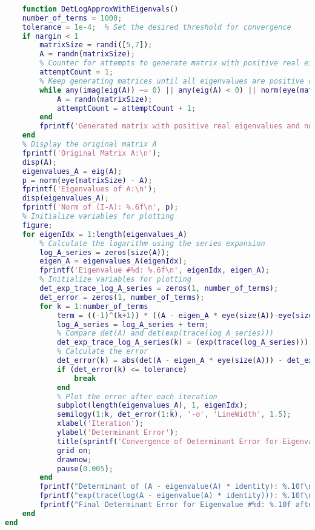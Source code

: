 \begin{sourcecode}
\label{sourcecode-eigenvalues}  
    \begin{lstlisting}[language=MATLAB]
    
    function DetLogApproxWithEigenvals()
    number_of_terms = 1000;
    tolerance = 1e-4;  % Set the desired threshold for convergence
    if nargin < 1
        matrixSize = randi([5,7]);
        A = randn(matrixSize);
        % Counter for attempts to generate matrix with positive real eigenvalues
        attemptCount = 1;
        % Keep generating matrices until all eigenvalues are positive real numbers
        while any(imag(eig(A)) ~= 0) || any(eig(A) < 0) || norm(eye(matrixSize) - A) > 1
            A = randn(matrixSize);
            attemptCount = attemptCount + 1;
        end
        fprintf('Generated matrix with positive real eigenvalues and norm(identity - A) < 1 after %d attempts.\n', attemptCount);
    end
    % Display the original matrix A
    fprintf('Original Matrix A:\n');
    disp(A);
    eigenvalues_A = eig(A);
    p = norm(eye(matrixSize) - A);
    fprintf('Eigenvalues of A:\n');
    disp(eigenvalues_A);
    fprintf('Norm of (I-A): %.6f\n', p);
    % Initialize variables for plotting
    figure;
    for eigenIdx = 1:length(eigenvalues_A)
        % Calculate the logarithm using the series expansion
        log_A_series = zeros(size(A));
        eigen_A = eigenvalues_A(eigenIdx);
        fprintf('Eigenvalue #%d: %.6f\n', eigenIdx, eigen_A);
        % Initialize variables for plotting
        det_exp_trace_log_A_series = zeros(1, number_of_terms);
        det_error = zeros(1, number_of_terms);
        for k = 1:number_of_terms
            term = ((-1)^(k+1)) * ((A - eigen_A * eye(size(A))-eye(size(A)))^k) / k;
            log_A_series = log_A_series + term;
            % Compare det(A) and det(exp(trace(log_A_series)))
            det_exp_trace_log_A_series(k) = (exp(trace(log_A_series)));
            % Calculate the error
            det_error(k) = abs(det(A - eigen_A * eye(size(A))) - det_exp_trace_log_A_series(k));
            if (det_error(k) <= tolerance)
                break
            end
            % Plot the error after each iteration
            subplot(length(eigenvalues_A), 1, eigenIdx);
            semilogy(1:k, det_error(1:k), '-o', 'LineWidth', 1.5);
            xlabel('Iteration');
            ylabel('Determinant Error');
            title(sprintf('Convergence of Determinant Error for Eigenvalue #%d', eigenIdx));
            grid on;
            drawnow;
            pause(0.005);
        end
        fprintf("Determinant of (A - eigenvalue(A) * identity): %.10f\n", det(A - eigen_A * eye(size(A))));
        fprintf("exp(trace(log(A - eigenvalue(A) * identity))): %.10f\n", det(exp(trace(log_A_series - eigen_A * eye(size(A))))));
        fprintf("Final Determinant Error for Eigenvalue #%d: %.10f after %d iteration \n", eigenIdx, det_error(end),k);
    end
end
    \end{lstlisting}
\end{sourcecode}


